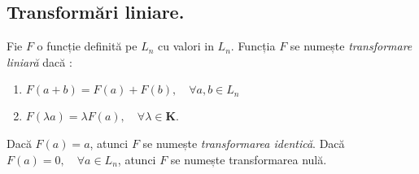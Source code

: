 \subsection{Transformări liniare.}
\label{ch1:sec_transforms:sub_linear_transforms}
\newtheorem{th_linear_transform}[theorem_liniar_space]{Definiția}
Fie $\mathit{F}$ o funcție definită pe $\mathit{L_{n}}$ cu valori in
$\mathit{L_{n}}$. Funcția $\mathit{F}$ se numește \textit{transformare liniară}
dacă :
\begin{enumerate}
  \item $F(a + b) = F(a) + F(b), \quad \forall a, b \in \mathit{L_{n}}$
  \item $F(\lambda a) = \lambda F(a), \quad \forall \lambda \in \mathbf{K}$.
\end{enumerate}
Dacă $F(a) = a$, atunci $F$ se numește \textit{transformarea identică}. Dacă
$F(a) = 0, \quad \forall a \in \mathit{L_{n}}$, atunci $F$ se numește
transformarea nulă.

